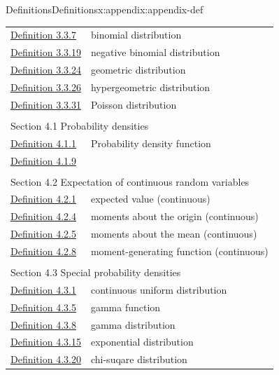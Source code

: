 \documentclass[oneside,10pt,]{book}
\numberwithin{equation}{section}
\begin{document}
\begin{appendixptx}{Definitions}{}{Definitions}{}{}{x:appendix:appendix-def}
\begin{longtable}[l]{ll}
\hyperref[x:definition:def-bin]{Definition 3.3.7}& binomial distribution\\
\hyperref[x:definition:def-neg-bin]{Definition 3.3.19}& negative binomial distribution\\
\hyperref[x:definition:def-geom]{Definition 3.3.24}& geometric distribution\\
\hyperref[x:definition:def-hyper]{Definition 3.3.26}& hypergeometric distribution\\
\hyperref[x:definition:def-poiss]{Definition 3.3.31}& Poisson distribution\\
\multicolumn{2}{l}{\null}\\[1.5ex] \multicolumn{2}{l}{\large Section 4.1 Probability densities}\\[0.5ex]
\hyperref[x:definition:def-continuous-probability-density-3-2]{Definition 4.1.1}& Probability density function\\
\hyperref[x:definition:def-continuous-distribution-function-3-3]{Definition 4.1.9}& \\
\multicolumn{2}{l}{\null}\\[1.5ex] \multicolumn{2}{l}{\large Section 4.2 Expectation of continuous random variables}\\[0.5ex]
\hyperref[x:definition:def-expected-value-4-1-cont]{Definition 4.2.1}& expected value (continuous)\\
\hyperref[x:definition:def-moments-about-origin-4-2-cont]{Definition 4.2.4}& moments about the origin (continuous)\\
\hyperref[x:definition:def-moments-about-mean-4-4-cont]{Definition 4.2.5}& moments about the mean (continuous)\\
\hyperref[x:definition:def-mgf-4-6-cont]{Definition 4.2.8}& moment-generating function (continuous)\\
\multicolumn{2}{l}{\null}\\[1.5ex] \multicolumn{2}{l}{\large Section 4.3 Special probability densities}\\[0.5ex]
\hyperref[x:definition:def-cont-unif]{Definition 4.3.1}& continuous uniform distribution\\
\hyperref[x:definition:def-gamma-func]{Definition 4.3.5}& gamma function\\
\hyperref[x:definition:def-cont-gamma]{Definition 4.3.8}& gamma distribution\\
\hyperref[x:definition:def-cont-exp]{Definition 4.3.15}& exponential distribution\\
\hyperref[x:definition:def-cont-chi]{Definition 4.3.20}& chi-suqare distribution\\

\end{longtable}
\end{appendixptx}
\end{document}
